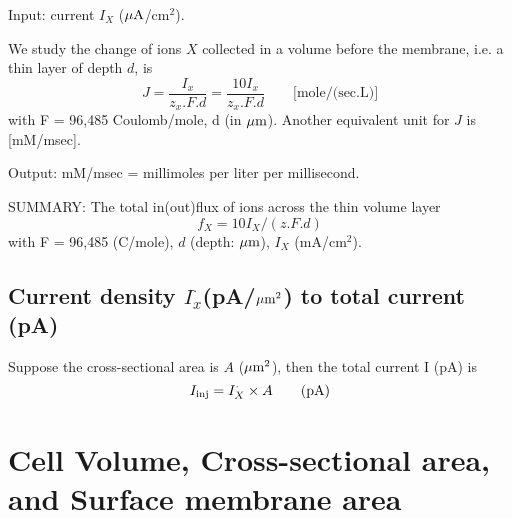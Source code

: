 Input: current $I_X$ (${\mu\text{A}}$/cm$^2$).


We study the change of ions $X$ collected in a volume  before the membrane, i.e.
a thin layer of depth $d$, is
\begin{equation}
J = \frac{I_x}{z_x . F . d} = \frac{10 I_x }{z_x.F.d} \qquad
\text{[mole/(sec.L)]}
\end{equation}
with F = 96,485 Coulomb/mole, d (in ${\mu\text{m}}$).
Another equivalent unit for $J$ is [mM/msec].


Output: mM/msec = millimoles per liter per millisecond.


SUMMARY: The total in(out)flux of ions across the thin volume layer
\begin{equation}
f_X = 10 I_X / (z.F.d)
\end{equation}
with F = 96,485 (C/mole), $d$ (depth: ${\mu\text{m}}$), $I_X$ (mA/cm$^2$).

\subsection{Current density $I^\cdot_x$(pA/${\mu\text{m}}^2$) to total current (pA)}

Suppose the cross-sectional area is $A$ (${\mu\text{m}}^2$), then the total current I
(pA) is
\begin{equation}
I_{\text{inj}} = I^\cdot_X \times A   \qquad \text{(pA)}
\end{equation}



\section{Cell Volume, Cross-sectional area, and Surface membrane area}
\label{sec:cell_volume}

